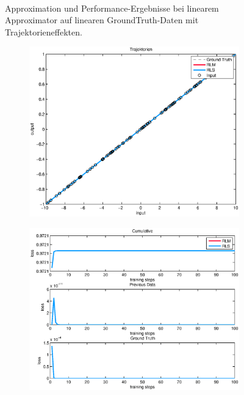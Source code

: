 \documentclass[a4paper, 12pt]{article}
\begin{document}
{\begin{figure}[H]
\begin{subfigure}[b]{0.4\textwidth}
                \caption{}
                \label{fig:apx:trajektorien1:perf}
        \end{subfigure}
        \\
        \caption{Approximation und Performance-Ergebnisse bei linearem Approximator auf linearen GroundTruth-Daten mit Trajektorieneffekten.}
        \label{fig:apx:trajektorien1}
\end{figure}
\begin{figure}[H]
        \centering
        \begin{subfigure}[b]{0.4\textwidth}
                \centering
                \includegraphics[width=\textwidth]{./images/copyofstats/trajektorien1_approx_100.eps}
                \caption{}
                \label{fig:apx:trajektorien3:approx}
        \end{subfigure}
        \begin{subfigure}[b]{0.4\textwidth}
                \centering
                \includegraphics[width=\textwidth]{./images/copyofstats/trajektorien1_perf_100.eps}

\end{subfigure}
\end{figure}}
\end{document}

